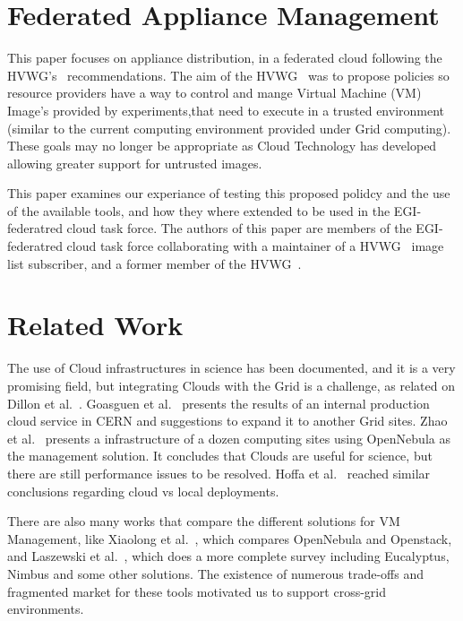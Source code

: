 \documentclass{llncs_Ibergrid2013}
\begin{document}
\section{Federated Appliance Management}
\label{sect-fedimagemanagement}

This paper focuses on appliance distribution, in a federated cloud following the HVWG's~\cite{hepix} recommendations. The aim of the HVWG~\cite{hepix} was to propose policies so resource providers have a way to control and mange Virtual Machine (VM) Image's provided by experiments,that need to execute in a trusted environment (similar to the current computing environment provided under Grid computing). These goals may no longer be appropriate as Cloud Technology has developed allowing greater support for untrusted images.

This paper examines our experiance of testing this proposed polidcy and the use of the available tools, and how they where extended to be used in the EGI-federatred cloud task force. The authors of this paper are members of the EGI-federatred cloud task force collaborating with a maintainer of a HVWG~\cite{hepix} image list subscriber, and a former member of the HVWG~\cite{hepix}.
\section{Related Work}
\label{sect-relatedwork}
The use of Cloud infrastructures in science has been documented, and it is a very promising field, but integrating Clouds with the Grid is a challenge, as related on Dillon et al.~\cite{Dillon2010}. Goasguen et al.~\cite{Goasguen2012} presents the results of an internal production cloud service in CERN and suggestions to expand it to another Grid sites. Zhao et al.~\cite{Zhao2012} presents a infrastructure of a dozen computing sites using OpenNebula as the management solution. It concludes that Clouds are useful for science, but there are still performance issues to be resolved. Hoffa et al.~\cite{Hoffa2008} reached similar conclusions regarding cloud vs local deployments.

There are also many works that compare the different solutions for VM Management, like Xiaolong et al.~\cite{Xiaolong2012}, which compares OpenNebula and Openstack, and Laszewski et al.~\cite{Laszewski2012}, which does a more complete survey including Eucalyptus, Nimbus and some other solutions. The existence of numerous trade-offs and fragmented market for these tools motivated us to support cross-grid environments.
\end{document}
